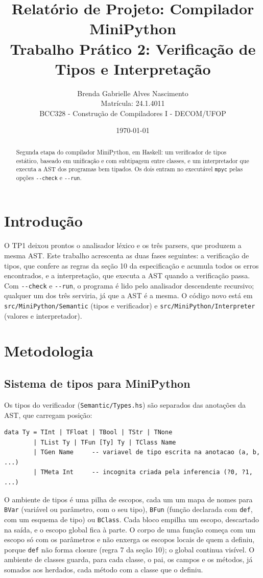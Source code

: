 \documentclass[12pt,a4paper]{article}
\title{Relatório de Projeto: Compilador MiniPython\\[4pt]
\large Trabalho Prático 2: Verificação de Tipos e Interpretação}
\author{
    Brenda Gabrielle Alves Nascimento \\
    Matrícula: 24.1.4011 \\
    BCC328 - Construção de Compiladores I - DECOM/UFOP
}
\date{\today}
\begin{document}
\maketitle

\begin{abstract}
Segunda etapa do compilador MiniPython, em Haskell: um verificador de
tipos estático, baseado em unificação e com subtipagem entre classes, e
um interpretador que executa a AST dos programas bem tipados. Os dois
entram no executável \texttt{mpyc} pelas opções \texttt{-{}-check} e
\texttt{-{}-run}.
\end{abstract}

\section{Introdução}

O TP1 deixou prontos o analisador léxico e os três parsers, que
produzem a mesma AST. Este trabalho acrescenta as duas fases seguintes:
a verificação de tipos, que confere as regras da seção 10 da
especificação e acumula todos os erros encontrados, e a interpretação,
que executa a AST quando a verificação passa. Com \texttt{-{}-check} e
\texttt{-{}-run}, o programa é lido pelo analisador descendente
recursivo; qualquer um dos três serviria, já que a AST é a mesma. O
código novo está em \texttt{src/MiniPython/Semantic} (tipos e
verificador) e \texttt{src/MiniPython/Interpreter} (valores e
interpretador).

\section{Metodologia}

\subsection{Sistema de tipos para MiniPython}

Os tipos do verificador (\texttt{Semantic/Types.hs}) são separados das
anotações da AST, que carregam posição:

\begin{lstlisting}[style=gram]
data Ty = TInt | TFloat | TBool | TStr | TNone
        | TList Ty | TFun [Ty] Ty | TClass Name
        | TGen Name     -- variavel de tipo escrita na anotacao (a, b, ...)
        | TMeta Int     -- incognita criada pela inferencia (?0, ?1, ...)
\end{lstlisting}

O ambiente de tipos é uma pilha de escopos, cada um um mapa de nomes
para \texttt{BVar} (variável ou parâmetro, com o seu tipo),
\texttt{BFun} (função declarada com \texttt{def}, com um esquema de
tipo) ou \texttt{BClass}. Cada bloco empilha um escopo, descartado na
saída, e o escopo global fica à parte. O corpo de uma função começa com
um escopo só com os parâmetros e não enxerga os escopos locais de quem
a definiu, porque \texttt{def} não forma closure (regra 7 da seção 10);
o global continua visível. O ambiente de classes guarda, para cada
classe, o pai, os campos e os métodos, já somados aos herdados, cada
método com a classe que o definiu.
\end{document}
